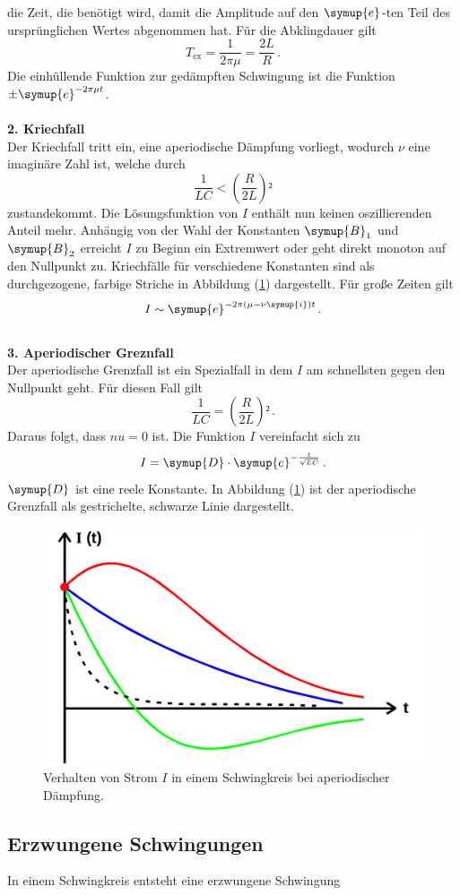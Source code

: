 die Zeit, die benötigt wird, damit die Amplitude auf den $\symup{e}$-ten Teil des 
ursprünglichen Wertes abgenommen hat. Für die Abklingdauer gilt
\begin{equation}
    T_{\text{ex}} = \frac{1}{2\pi\mu} = \frac{2 L}{R} \, .
\end{equation}
Die einhüllende Funktion zur gedämpften Schwingung ist die Funktion $\pm \symup{e}^{-2\pi\mu t}$. \\
\\
\textbf{2. Kriechfall}\\
Der Kriechfall tritt ein, eine aperiodische Dämpfung vorliegt, wodurch
 $\nu$ eine imaginäre Zahl ist, welche durch 
\begin{equation*}
    \frac{1}{LC} < \left(\frac{R}{2L}\right)² 
\end{equation*}
zustandekommt. Die Lösungsfunktion von $I$ enthält nun keinen oszillierenden Anteil mehr. 
Anhängig von der Wahl der Konstanten $\symup{B}_1$ und $\symup{B}_2$ erreicht $I$ zu Beginn ein Extremwert 
oder geht direkt monoton auf den Nullpunkt zu. Kriechfälle für verschiedene Konstanten 
sind als durchgezogene, farbige Striche in Abbildung (\ref{pic:aperiodische_Daempfung})
dargestellt. 
Für große Zeiten gilt
\begin{equation*}
    I \sim \symup{e}^{- 2\pi \left(\mu - \nu \symup{i}\right)t}\, . 
\end{equation*}
 \\
\textbf{3. Aperiodischer Greznfall}\\
Der aperiodische Grenzfall ist ein Spezialfall in dem $I$ am schnellsten gegen den 
Nullpunkt geht. 
Für diesen Fall gilt 
\begin{equation*}
    \frac{1}{LC} = \left(\frac{R}{2L}\right)² \, .
\end{equation*}
Daraus folgt, dass $nu = 0$ ist. Die Funktion $I$ vereinfacht sich zu
\begin{equation*}
    I = \symup{D} \cdot \symup{e}^{- \frac{t}{\sqrt{L C}}} \, .
\end{equation*} 
$\symup{D}$ ist eine reele Konstante. In Abbildung (\ref{pic:aperiodische_Daempfung})
ist der aperiodische Grenzfall als gestrichelte, schwarze Linie dargestellt. 

\begin{figure}
    \centering
    \includegraphics[width=0.7\linewidth]{Aperiodische_Daempfung_Abbildung.png}
    \caption{Verhalten von Strom $I$ in einem Schwingkreis bei aperiodischer Dämpfung.}
    \label{pic:aperiodische_Daempfung}
\end{figure}

\subsection{Erzwungene Schwingungen}
In einem Schwingkreis entsteht eine erzwungene Schwingung 



